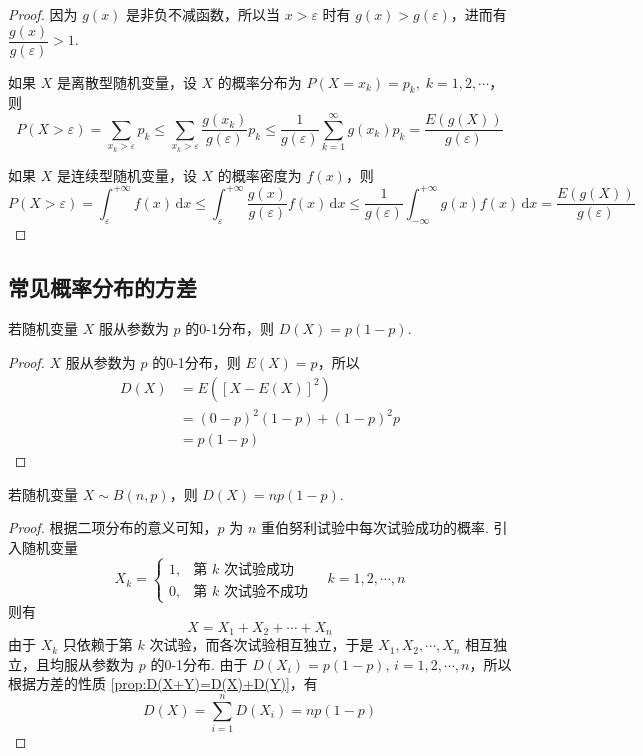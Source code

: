 \begin{proof}
    因为 $g(x)$ 是非负不减函数，所以当 $x > \varepsilon$ 时有 $g(x) > g(\varepsilon)$，进而有 $\dfrac{g(x)}{g(\varepsilon)} > 1$.

    如果 $X$ 是离散型随机变量，设 $X$ 的概率分布为 $P(X = x_k) = p_k, \; k=1,2,\cdots$，则
    $$
    P(X > \varepsilon) = \sum_{x_k > \varepsilon} p_k \leqslant \sum_{x_k > \varepsilon} \dfrac{g(x_k)}{g(\varepsilon)} p_k \leqslant \dfrac{1}{g(\varepsilon)} \sum_{k=1}^{\infty} g(x_k) p_k = \dfrac{E(g(X))}{g(\varepsilon)}
    $$

    如果 $X$ 是连续型随机变量，设 $X$ 的概率密度为 $f(x)$，则
    $$
    P(X > \varepsilon) = \int_{\varepsilon}^{+\infty} f(x)\,\text{d}x \leqslant \int_{\varepsilon}^{+\infty} \dfrac{g(x)}{g(\varepsilon)} f(x)\,\text{d}x \leqslant \dfrac{1}{g(\varepsilon)} \int_{-\infty}^{+\infty} g(x) f(x)\,\text{d}x = \dfrac{E(g(X))}{g(\varepsilon)}
    $$
\end{proof}

\subsection{常见概率分布的方差}

\begin{conclusion}
    \indent 若随机变量 $X$ 服从参数为 $p$ 的0-1分布，则 $D(X) = p(1-p)$.
\end{conclusion}

\begin{proof}
    $X$ 服从参数为 $p$ 的0-1分布，则 $E(X)=p$，所以
    $$
    \begin{aligned}
        D(X) &= E([X-E(X)]^2) \\
        &= (0-p)^2 (1-p) + (1-p)^2 p \\
        &= p(1-p)
    \end{aligned}
    $$

    \vspace{-1.3em}
\end{proof}

\begin{conclusion}
    \indent 若随机变量 $X \sim B(n,p)$，则 $D(X) = np(1-p)$.
\end{conclusion}

\begin{proof}
    根据二项分布的意义可知，$p$ 为 $n$ 重伯努利试验中每次试验成功的概率. 引入随机变量
    $$
    X_k = \begin{cases}
        1, & \text{第 $k$ 次试验成功} \\
        0, & \text{第 $k$ 次试验不成功}
    \end{cases} \quad k=1,2,\cdots,n
    $$
    则有
    $$
    X = X_1 + X_2 + \cdots + X_n
    $$
    由于 $X_k$ 只依赖于第 $k$ 次试验，而各次试验相互独立，于是 $X_1, X_2, \cdots, X_n$ 相互独立，且均服从参数为 $p$ 的0-1分布. 由于 $D(X_i) = p(1-p), \, i=1,2,\cdots,n$，所以根据方差的性质 \ref{prop:D(X+Y)=D(X)+D(Y)}，有
    $$
    D(X) = \sum_{i=1}^n D(X_i) = np(1-p)
    $$
\end{proof}

